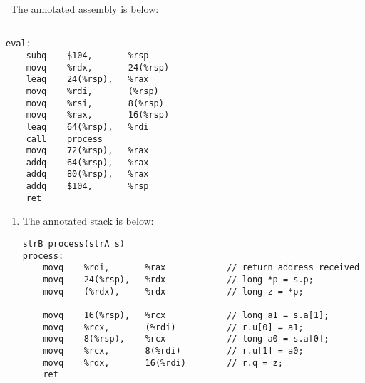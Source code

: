 \documentclass[12pt]{article}
\newenvironment{sol}[1][Solution]{\begin{trivlist}
		\item[\hskip \labelsep {\bfseries #1:}]}{\end{trivlist}}
\begin{document}
{\begin{sol}
	\
	The annotated assembly is below:
	\begin{lstlisting}[language={}]

eval:
	subq	$104,		%rsp
	movq	%rdx,		24(%rsp)
	leaq	24(%rsp),	%rax
	movq	%rdi,		(%rsp)
	movq	%rsi,		8(%rsp)
	movq	%rax,		16(%rsp)
	leaq	64(%rsp),	%rdi
	call	process
	movq	72(%rsp),	%rax
	addq	64(%rsp),	%rax
	addq	80(%rsp),	%rax
	addq	$104,		%rsp
	ret
	\end{lstlisting}
	\begin{enumerate}[label=(\alph*)]
		\item The annotated stack is below:
		\begin{lstlisting}[language={}]
	strB process(strA s)
process:
	movq	%rdi,		%rax			// return address received
	movq	24(%rsp),	%rdx			// long *p = s.p;
	movq	(%rdx),		%rdx			// long z = *p;
	
	movq	16(%rsp),	%rcx			// long a1 = s.a[1];
	movq	%rcx,		(%rdi)			// r.u[0] = a1;
	movq	8(%rsp),	%rcx			// long a0 = s.a[0];
	movq	%rcx,		8(%rdi)			// r.u[1] = a0;
	movq	%rdx,		16(%rdi)		// r.q = z;
	ret


\end{lstlisting}
\end{enumerate}
\end{sol}}
\end{document}
